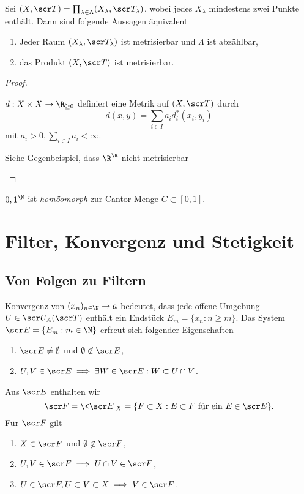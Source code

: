 \begin{st}
	Sei $(X, \scr T) = \prod_{\lambda \in \Lambda} (X_\lambda, \scr T_\lambda)$, wobei jedes $X_\lambda$ mindestens zwei Punkte enthält.
	Dann sind folgende Aussagen äquivalent
	\begin{enumerate}[1)]
		\item
			Jeder Raum $(X_\lambda, \scr T_\lambda)$ ist metrisierbar und $\Lambda$ ist abzählbar,
		\item
			das Produkt $(X, \scr T)$ ist metrisierbar.
	\end{enumerate}
	\begin{proof}
		\begin{segnb}[„$\implies$“]
			$d: X \times X \to \R_{\ge 0}$ definiert eine Metrik auf $(X, \scr T)$ durch
			\[
				d(x,y) = \sum_{i\in I} a_i d_i^*(x_i, y_i)
			\]
			mit $a_i > 0, \sum_{i\in I} a_i < \infty$.
		\end{segnb}
		\begin{segnb}[„$\impliedby$“]
			Siehe Gegenbeispiel, dass $\R^\R$ nicht metrisierbar
		\end{segnb}
	\end{proof}
\end{st}

\begin{ex}
	${0,1}^\N$ ist \emph{homöomorph} zur Cantor-Menge $C \subset [0,1]$.
\end{ex}


\section{Filter, Konvergenz und Stetigkeit}


\subsection{Von Folgen zu Filtern}

Konvergenz von $(x_n)_{n\in\N} \to a$ bedeutet, dass jede offene Umgebung $U \in \scr U_A(\scr T)$ enthält ein Endstück $E_m = \{ x_n : n \ge m \}$.
Das System $\scr E = \{E_m : m \in \N\}$ erfreut sich folgender Eigenschaften
\begin{enumerate}[(FB1)]
	\item
		$\scr E \neq \emptyset$ und $\emptyset \not\in \scr E$,
	\item
		$U,V \in \scr E \implies \exists W \in \scr E: W \subset U \cap V$.
\end{enumerate}
Aus $\scr E$ enthalten wir
\[
	\scr F
	= \<\scr E\>_X
	= \{ F \subset X : E \subset F \text{ für ein $E \in \scr E$} \}.
\]
Für $\scr F$ gilt
\begin{enumerate}[(F1)]
	\item
		$X \in \scr F$ und $\emptyset \not\in \scr F$,
	\item
		$U, V \in \scr F \implies U \cap V \in \scr F$,
	\item
		$U \in \scr F, U \subset V \subset X \implies V \in \scr F$.
\end{enumerate}

